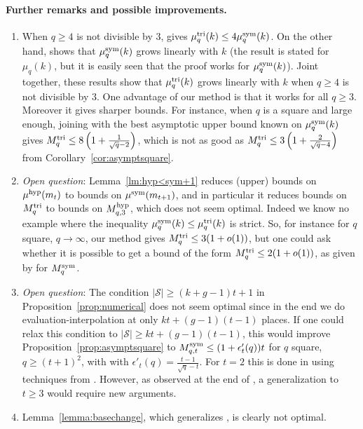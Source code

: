 \documentclass[11pt]{article}
\begin{document}
\paragraph{Further remarks and possible improvements.}
\begin{enumerate}
\item When $q\geq4$ is not divisible by $3$, \cite[Thm.~2]{SL84} gives $\mu^{\textrm{tri}}_q(k)\leq 4\mu^{\textrm{sym}}_q(k)$.
On the other hand, \cite{CC88} shows that $\mu^{\textrm{sym}}_q(k)$ grows linearly with $k$ (the result is stated for $\mu_q(k)$,
but it is easily seen that the proof works for $\mu^{\textrm{sym}}_q(k)$). Joint together, these results show that $\mu^{\textrm{tri}}_q(k)$ grows linearly with $k$
when $q\geq4$ is not divisible by $3$. One advantage of our method is that it works for all $q\geq3$.
Moreover it gives sharper bounds. For instance, when $q$ is a square and large enough, joining \cite[Thm.~2]{SL84} with the best asymptotic upper bound known on $\mu^{\textrm{sym}}_q(k)$ \cite[Thm.~6.4]{Randriam12} gives $M^{\textrm{tri}}_q\leq 8\left(1+\frac{1}{\sqrt{q}-2}\right)$,
which is not as good as $M^{\textrm{tri}}_q\leq 3\left(1+\frac{2}{\sqrt{q}-4}\right)$ from Corollary~\ref{cor:asymptsquare}.
\item \emph{Open question}: Lemma~\ref{lm:hyp<sym+1} reduces (upper) bounds on $\mu^{\textrm{hyp}}(m_t)$ to bounds on $\mu^{\textrm{sym}}(m_{t+1})$,
and in particular it reduces bounds on $M^{\textrm{tri}}_q$ to bounds on $M^{\textrm{hyp}}_{q,3}$, which does not seem optimal.
Indeed we know no example where the inequality $\mu^{\textrm{sym}}_q(k)\leq\mu^{\textrm{tri}}_q(k)$ is strict.
So, for instance for $q$ square, $q\to\infty$, our method gives $M^{\textrm{tri}}_q\leq 3(1+o(1))$,
but one could ask whether it is possible to get a bound of the form $M^{\textrm{tri}}_q\leq 2(1+o(1))$,
as given by \cite[Thm.~6.4]{Randriam12} for $M^{\textrm{sym}}_q$.
\item \emph{Open question}: The condition $|\mathcal{S}|\geq (k+g-1)t+1$ in Proposition~\ref{prop:numerical}
does not seem optimal since in the end we do evaluation-interpolation at only $kt+(g-1)(t-1)$ places.
If one could relax this condition to $|\mathcal{S}|\geq kt+(g-1)(t-1)$, this would improve Proposition~\ref{prop:asymptsquare}
to $M^{\textrm{sym}}_{q,t}\leq(1+\epsilon'_t(q))t$ for $q$ square, $q\geq(t+1)^2$, with 
with $\epsilon'_t(q)=\frac{t-1}{\sqrt{q}-t}$.
For $t=2$ this is done in \cite{Randriam12,Randriam19} using techniques from \cite{Randriam13}.
However, as observed at the end of \cite{Randriam13}, a generalization to $t\geq3$ would require new arguments.
\item Lemma~\ref{lemma:basechange}, which generalizes \cite[Lemma~1.2]{STV92}, is clearly not optimal.

\end{enumerate}
\end{document}
